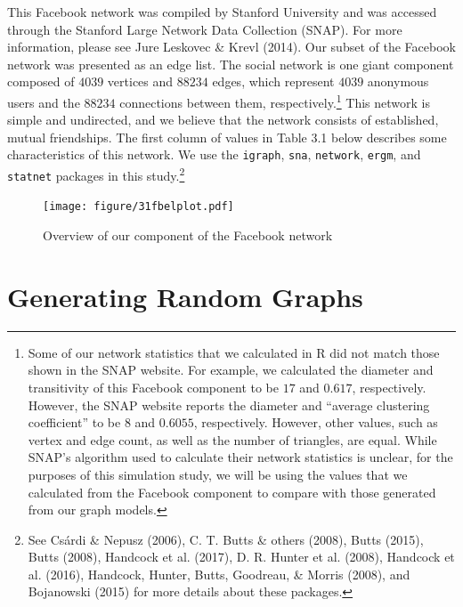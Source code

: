 \documentclass[12pt,twoside]{amherstthesis}
\begin{document}
  This Facebook network was compiled by Stanford University and was
  accessed through the Stanford Large Network Data Collection (SNAP). For
  more information, please see Jure Leskovec \& Krevl (2014). Our subset
  of the Facebook network was presented as an edge list. The social
  network is one giant component composed of \(4039\) vertices and
  \(88234\) edges, which represent \(4039\) anonymous users and the
  \(88234\) connections between them, respectively.\footnote{Some of our
    network statistics that we calculated in R did not match those shown
    in the SNAP website. For example, we calculated the diameter and
    transitivity of this Facebook component to be \(17\) and \(0.617\),
    respectively. However, the SNAP website reports the diameter and
    ``average clustering coefficient'' to be \(8\) and \(0.6055\),
    respectively. However, other values, such as vertex and edge count, as
    well as the number of triangles, are equal. While SNAP's algorithm
    used to calculate their network statistics is unclear, for the
    purposes of this simulation study, we will be using the values that we
    calculated from the Facebook component to compare with those generated
    from our graph models.} This network is simple and undirected, and we
  believe that the network consists of established, mutual friendships.
  The first column of values in Table 3.1 below describes some
  characteristics of this network. We use the \texttt{igraph},
  \texttt{sna}, \texttt{network}, \texttt{ergm}, and \texttt{statnet}
  packages in this study.\footnote{See Csárdi \& Nepusz (2006), C. T.
    Butts \& others (2008), Butts (2015), Butts (2008), Handcock et al.
    (2017), D. R. Hunter et al. (2008), Handcock et al. (2016), Handcock,
    Hunter, Butts, Goodreau, \& Morris (2008), and Bojanowski (2015) for
    more details about these packages.}
  
  \begin{figure}[htbp]
  \centering
  \texttt{[image: figure/31fbelplot.pdf]}
  \caption{Overview of our component of the Facebook network}
  \end{figure}
  
  \section{Generating Random Graphs}\label{generating-random-graphs}
  
\end{document}
